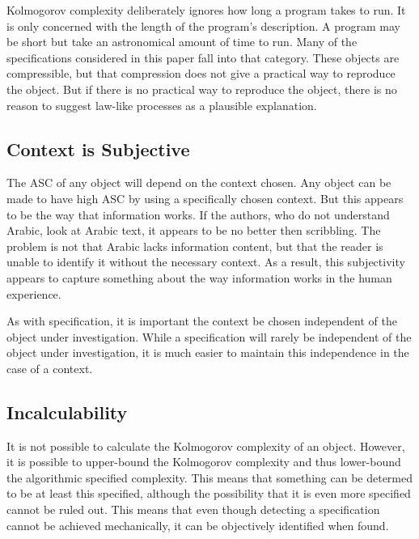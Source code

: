 Kolmogorov complexity deliberately ignores how long a program takes to run.
It is only concerned with the length of the program's description.
A program may be short but take an astronomical amount of time to run.
Many of the specifications considered in this paper fall into that category.
These objects are compressible, but that compression does not give a practical way to reproduce the object.
But if there is no practical way to reproduce the object, there is no reason to suggest law-like processes as a plausible explanation.

\subsection{Context is Subjective}
The ASC of any object will depend on the context chosen.
Any object can be made to have high ASC by using a specifically chosen context.
But this appears to be the way that information works.
If the authors, who do not understand Arabic, look at Arabic text, it appears to be no better then scribbling.
The problem is not that Arabic lacks information content, but that the reader is unable to identify it without the necessary context.
As a result, this subjectivity appears to capture something about the way information works in the human experience.

As with specification, it is important the context be chosen independent of the object under investigation.
While a specification will rarely be independent of the object under investigation, it is much easier to maintain this independence in the case of a context.

\subsection{Incalculability}
It is not possible to calculate the Kolmogorov complexity of an object.
However, it is possible to upper-bound the Kolmogorov complexity and thus lower-bound the algorithmic specified complexity.
This means that something can be determed to be at least this specified, although the possibility that it is even more specified cannot be ruled out.
This means that even though detecting a specification cannot be achieved mechanically, it can be objectively identified when found.

